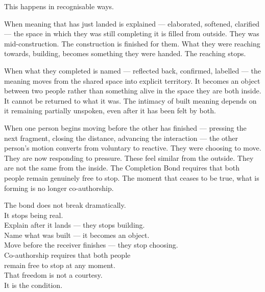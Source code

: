 This happens in recognisable ways.

When meaning that has just landed is explained --- elaborated, softened, 
clarified --- the space in which they was still completing it is filled 
from outside. They was mid-construction. The construction is finished 
for them. What they were reaching towards, building, becomes something they were handed. 
The reaching stops.

When what they completed is named --- reflected back, confirmed, 
labelled --- the meaning moves from the shared space into explicit 
territory. It becomes an object between two people rather than 
something alive in the space they are both inside. It cannot be 
returned to what it was. The intimacy of built meaning depends on 
it remaining partially unspoken, even after it has been felt by both.

When one person begins moving before the other has finished --- 
pressing the next fragment, closing the distance, advancing the 
interaction --- the other person's motion converts from voluntary 
to reactive. They were choosing to move. They are now responding to 
pressure. These feel similar from the outside. They are not the 
same from the inside. The Completion Bond requires that both people 
remain genuinely free to stop. The moment that ceases to be true, 
what is forming is no longer co-authorship.

\begin{calloutbox}
The bond does not break dramatically.\\
It stops being real.\\[0.4em]
Explain after it lands --- they stops building.\\
Name what was built --- it becomes an object.\\
Move before the receiver finishes --- they stop choosing.\\[0.4em]
Co-authorship requires that both people\\
remain free to stop at any moment.\\
That freedom is not a courtesy.\\
It is the condition.
\end{calloutbox}